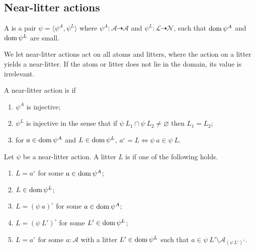 \subsection{Near-litter actions}

\begin{definition}
    A  is a pair \( \psi = \langle \psi^A, \psi^L \rangle \) where \( \psi^A : \mathcal A \rightdasharrow \mathcal A \) and \( \psi^L : \mathcal L \rightdasharrow \mathcal N \), such that \( \operatorname{dom} \psi^A \) and \( \operatorname{dom} \psi^L \) are small.
\end{definition}
We let near-litter actions act on all atoms and litters, where the action on a litter yields a near-litter.
If the atom or litter does not lie in the domain, its value is irrelevant.
\begin{definition}
    \label{def:NearLitterAction.Lawful}
    A near-litter action is  if
    \begin{enumerate}
        \item \( \psi^A \) is injective;
        \item \( \psi^L \) is injective in the sense that if \( \psi\ L_1 \cap \psi\ L_2 \neq \varnothing \) then \( L_1 = L_2 \);
        \item for \( a \in \operatorname{dom} \psi^A \) and \( L \in \operatorname{dom} \psi^L \), \( a^\circ = L \Leftrightarrow \psi\ a \in \psi\ L \).
    \end{enumerate}
\end{definition}
\begin{definition}
    Let \( \psi \) be a near-litter action.
    A litter \( L \) is  if one of the following holds.
    \begin{enumerate}
        \item \( L = a^\circ \) for some \( a \in \operatorname{dom} \psi^A \);
        \item \( L \in \operatorname{dom} \psi^L \);
        \item \( L = (\psi\ a)^\circ \) for some \( a \in \operatorname{dom} \psi^A \);
        \item \( L = (\psi\ L')^\circ \) for some \( L' \in \operatorname{dom} \psi^L \);
        \item \( L = a^\circ \) for some \( a : \mathcal A \) with a litter \( L' \in \operatorname{dom} \psi^L \) such that \( a \in \psi\ L' \setminus \mathcal A_{(\psi\ L')^\circ} \).
    \end{enumerate}
\end{definition}
